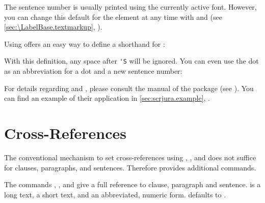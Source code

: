 %
The sentence number is usually printed
using the currently active font.  However, you can change this default for the
 element at any time with
%
 and
 (see
\autoref{sec:\LabelBase.textmarkup},
).%
%

Using  offers an easy way
to define a shorthand for :%
\label{sec:scrjura.shorthandexample}%
\begin{lstcode}[moretexcs={useshorthands,defineshorthand}]
\end{lstcode}
With this definition, any space after \lstinline|'S| will be ignored. You can
even use the dot as an abbreviation for a dot and a new sentence number:
\begin{lstcode}[moretexcs={useshorthands,defineshorthand}]
\end{lstcode}
For details regarding  and ,
please consult the manual of the  package (see
\cite{package:babel}). You can find an example of their application in
\autoref{sec:scrjura.example}, .%
\EndIndexGroup
%
\EndIndexGroup
%
\EndIndexGroup


\section{Cross-References}

The conventional mechanism to set cross-references using
, , and
 does not suffice for clauses, paragraphs, and sentences.
Therefore  provides additional commands.

\begin{Declaration}
\end{Declaration}
The commands , , and  give a full
reference to clause, paragraph and sentence.  is a long text,
 a short text, and  an abbreviated, numeric form.
 defaults to .%
\EndIndexGroup



